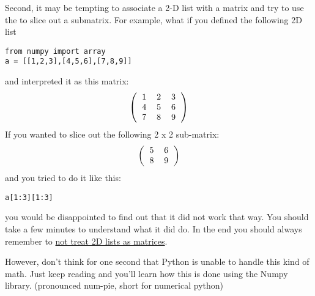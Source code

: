 Second, it may be tempting to associate a
2-D list with a matrix and try to use the \code{:} to slice out a
submatrix.  For example, what if you defined the following 2D list
\begin{Verbatim}
from numpy import array
a = [[1,2,3],[4,5,6],[7,8,9]]
\end{Verbatim}
and interpreted it as this matrix:
\begin{equation}
\left( \begin{tabular}{ccc}
1 & 2 & 3\\
4 & 5 & 6\\
7 & 8 & 9\\
\end{tabular}
\right)
\end{equation}
If you wanted to slice out the following 2 x 2 sub-matrix:
\begin{equation}
\left(\begin{tabular}{cc}
5 & 6 \\
8 & 9 \\
\end{tabular}
\right)
\end{equation}
and you tried to do it like this:
\begin{Verbatim}
a[1:3][1:3]
\end{Verbatim}
you would be disappointed to find out that it did not work that way.
You should take a few minutes to understand what it did do.  In the
end you should always remember to \ul{not treat 2D lists as matrices}.

However, don't think for one second that Python is unable
to handle this kind of math.  Just keep reading and you'll learn how
this is done using the Numpy library. (pronounced num-pie, short for numerical
python)


